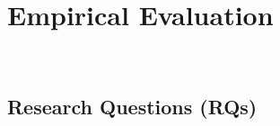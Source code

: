 \section{Empirical Evaluation}~\label{sec:evaluation}



\subsection{Research Questions (RQs)}~\label{subsec:RQs}